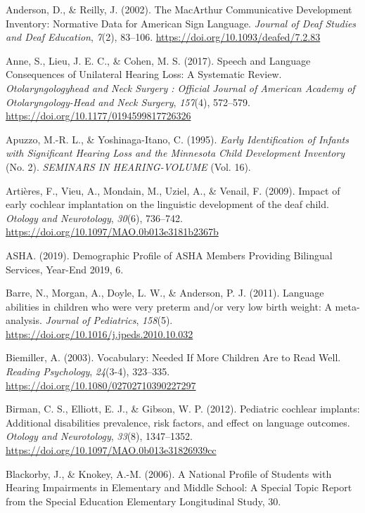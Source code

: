 \documentclass[english,man]{apa6}
\begin{document}
\leavevmode\hypertarget{ref-anderson2002}{}%
Anderson, D., \& Reilly, J. (2002). The MacArthur Communicative Development Inventory: Normative Data for American Sign Language. \emph{Journal of Deaf Studies and Deaf Education}, \emph{7}(2), 83--106. \url{https://doi.org/10.1093/deafed/7.2.83}

\leavevmode\hypertarget{ref-anne2017}{}%
Anne, S., Lieu, J. E. C., \& Cohen, M. S. (2017). Speech and Language Consequences of Unilateral Hearing Loss: A Systematic Review. \emph{Otolaryngologyhead and Neck Surgery : Official Journal of American Academy of Otolaryngology-Head and Neck Surgery}, \emph{157}(4), 572--579. \url{https://doi.org/10.1177/0194599817726326}

\leavevmode\hypertarget{ref-apuzzo1995}{}%
Apuzzo, M.-R. L., \& Yoshinaga-Itano, C. (1995). \emph{Early Identification of Infants with Significant Hearing Loss and the Minnesota Child Development Inventory} (No. 2). \emph{SEMINARS IN HEARING-VOLUME} (Vol. 16).

\leavevmode\hypertarget{ref-artieres2009}{}%
Artières, F., Vieu, A., Mondain, M., Uziel, A., \& Venail, F. (2009). Impact of early cochlear implantation on the linguistic development of the deaf child. \emph{Otology and Neurotology}, \emph{30}(6), 736--742. \url{https://doi.org/10.1097/MAO.0b013e3181b2367b}

\leavevmode\hypertarget{ref-asha2019}{}%
ASHA. (2019). Demographic Profile of ASHA Members Providing Bilingual Services, Year-End 2019, 6.

\leavevmode\hypertarget{ref-barre2011}{}%
Barre, N., Morgan, A., Doyle, L. W., \& Anderson, P. J. (2011). Language abilities in children who were very preterm and/or very low birth weight: A meta-analysis. \emph{Journal of Pediatrics}, \emph{158}(5). \url{https://doi.org/10.1016/j.jpeds.2010.10.032}

\leavevmode\hypertarget{ref-biemiller2003}{}%
Biemiller, A. (2003). Vocabulary: Needed If More Children Are to Read Well. \emph{Reading Psychology}, \emph{24}(3-4), 323--335. \url{https://doi.org/10.1080/02702710390227297}

\leavevmode\hypertarget{ref-birman2012}{}%
Birman, C. S., Elliott, E. J., \& Gibson, W. P. (2012). Pediatric cochlear implants: Additional disabilities prevalence, risk factors, and effect on language outcomes. \emph{Otology and Neurotology}, \emph{33}(8), 1347--1352. \url{https://doi.org/10.1097/MAO.0b013e31826939cc}

\leavevmode\hypertarget{ref-blackorby2006}{}%
Blackorby, J., \& Knokey, A.-M. (2006). A National Profile of Students with Hearing Impairments in Elementary and Middle School: A Special Topic Report from the Special Education Elementary Longitudinal Study, 30.
\end{document}
